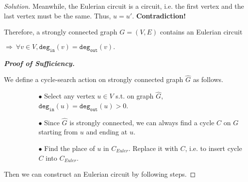 \documentclass{article}
\newenvironment{solution}{\begin{proof}[\noindent\it Solution]}{\end{proof}}
\begin{document}
\begin{solution}
    \hspace{0.5em}
    Meanwhile, the Eulerian circuit is a circuit, i.e. the first vertex and the last vertex must be the same. Thus, $u=u'$. \textbf{Contradiction!}
    
    \hspace{0.5em}
    Therefore, a strongly connected graph $G=(V,E)$ contains an Eulerian circuit 
    
    \hspace{5.5em}
    $\Longrightarrow\ \forall v\in V, \mathtt{deg_{in}}(v)=\mathtt{deg_{out}}(v).$
    
    \vspace{2em}
    \hspace{-2em} \textbf{\textit{Proof of Sufficiency.}}
    
    \vspace{0.3em} \hspace{0.5em}
    We define a cycle-search action on strongly connected graph $\hat{G}$ as follows.
    
    \vspace{-0.5em}
    \begin{itemize}
        \item[]\begin{itemize}
            \item[] \begin{itemize}
            \item[$\bullet$] Select any vertex $u\in V$ s.t. on graph $\hat{G}$, $\mathtt{deg_{in}}(u)=\mathtt{deg_{out}}(u)>0$.
            \item[$\bullet$] Since $\hat{G}$ is strongly connected, we can always find a cycle $C$ on $G$ starting from $u$ and ending at $u$. 
            \item[$\bullet$] Find the place of $u$ in $C_{Euler}.$ Replace it with $C$, i.e. to insert cycle $C$ into $C_{Euler}.$
        \end{itemize}
        \end{itemize} 
    \end{itemize}
    
    \hspace{0.5em}
    Then we can construct an Eulerian circuit by following steps.
    

\end{solution}
\end{document}
